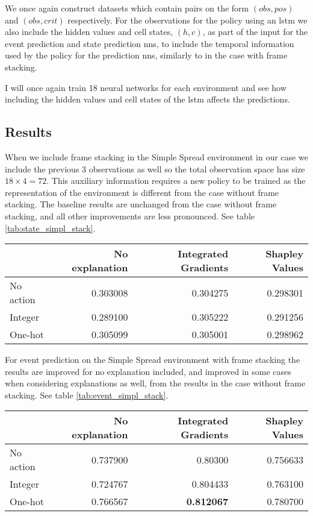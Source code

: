 \documentclass[UKenglish]{uiomasterthesis}
\begin{document}
We once again construct datasets which contain pairs on the form $(obs, pos)$ and $(obs, crit)$ respectively. For the observations for the policy using an \ac{lstm} we also include the hidden values and cell states, $(h,c)$, as part of the input for the event prediction and state prediction \acp{nn}, to include the temporal information used by the policy for the prediction \acp{nn}, similarly to in the case with frame stacking.

I will once again train 18 neural networks for each environment and see how including the hidden values and cell states of the \ac{lstm} affects the predictions.

\subsection{Results}
When we include frame stacking in the Simple Spread environment in our case we include the previous 3 observations as well so the total observation space has size $18\times 4 = 72$. This auxiliary information requires a new policy to be trained as the representation of the environment is different from the case without frame stacking. The baseline results are unchanged from the case without frame stacking, and all other improvements are less pronounced. See table \ref{tab:state_simpl_stack}.

\begin{center}
\label{tab:state_simpl_stack}
\begin{tabular}{lrrr}
\toprule
 & No explanation & Integrated Gradients & Shapley Values \\
\midrule
No action & 0.303008 & 0.304275 & 0.298301 \\
Integer & 0.289100 & 0.305222 & 0.291256 \\
One-hot & 0.305099 & 0.305001 & 0.298962 \\
\bottomrule
\end{tabular}
\end{center}

For event prediction on the Simple Spread environment with frame stacking the results are improved for no explanation included, and improved in some cases when considering explanations as well, from the results in the case without frame stacking. See table \ref{tab:event_simpl_stack}.


\begin{center}
\label{tab:event_simpl_stack}
\begin{tabular}{lrrr}
\toprule
 & No explanation & Integrated Gradients & Shapley Values \\
\midrule
No action & 0.737900 & 0.80300 & 0.756633 \\
Integer & 0.724767 & 0.804433 & 0.763100 \\
One-hot & 0.766567 & \textbf{0.812067} & 0.780700 \\
\bottomrule
\end{tabular}
\end{center}
\end{document}

